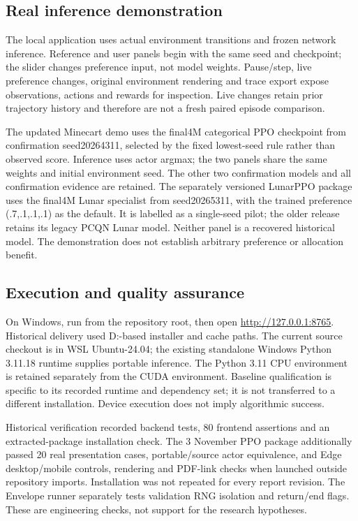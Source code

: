 \subsection{Real inference demonstration}
The local application uses actual environment transitions and frozen network
inference. Reference and user panels begin with the same seed and checkpoint;
the slider changes preference input, not model weights. Pause/step, live
preference changes, original environment rendering and trace export expose
observations, actions and rewards for inspection. Live changes retain prior
trajectory history and therefore are not a fresh paired episode comparison.

The updated Minecart demo uses the final4M categorical PPO checkpoint from
confirmation seed20264311, selected by the fixed lowest-seed rule rather than
observed score. Inference uses actor argmax; the two panels share the same
weights and initial environment seed. The other two confirmation models and
all confirmation evidence are retained. The separately versioned LunarPPO
package uses the final4M Lunar specialist from seed20265311, with the trained
preference (.7,.1,.1,.1) as the default. It is labelled as a single-seed pilot;
the older release retains its legacy PCQN Lunar model. Neither panel is a recovered historical model.
The demonstration does not establish arbitrary preference or allocation benefit.

\subsection{Execution and quality assurance}
On Windows, run  from the repository root, then
open \url{http://127.0.0.1:8765}. Historical delivery used D:-based installer
and cache paths. The current source checkout is in WSL Ubuntu-24.04; the
existing standalone Windows Python 3.11.18 runtime supplies portable inference.
The Python 3.11 CPU environment is retained separately from the CUDA environment.
Baseline qualification is specific to its recorded runtime and dependency set;
it is not transferred to a different installation. Device execution does not
imply algorithmic success.

Historical verification recorded backend tests, 80 frontend assertions and an
extracted-package installation check. The 3 November PPO package additionally
passed 20 real presentation cases, portable/source actor equivalence, and Edge
desktop/mobile controls, rendering and PDF-link checks when launched outside
repository imports. Installation was not repeated for every report revision.
The Envelope runner separately tests validation RNG isolation and return/end
flags. These are engineering checks, not support for the research hypotheses.

